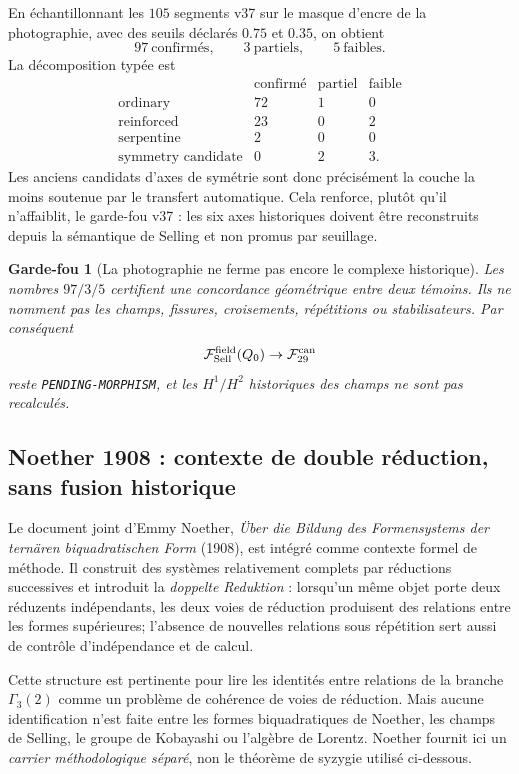 \documentclass[11pt,a4paper]{article}
\newtheorem{guardrail}[theorem]{Garde-fou}
\newcommand{\certPending}{\texttt{PENDING-MORPHISM}}
\begin{document}
En échantillonnant les $105$ segments v37 sur le masque d'encre de la photographie, avec des seuils déclarés $0.75$ et $0.35$, on obtient
\[
 \boxed{97\ \text{confirmés},\qquad 3\ \text{partiels},\qquad 5\ \text{faibles}}.
\]
La décomposition typée est
\[
\begin{array}{c|ccc}
&\text{confirmé}&\text{partiel}&\text{faible}\\ \hline
\text{ordinary}&72&1&0\\
\text{reinforced}&23&0&2\\
\text{serpentine}&2&0&0\\
\text{symmetry candidate}&0&2&3.
\end{array}
\]
Les anciens candidats d'axes de symétrie sont donc précisément la couche la moins soutenue par le transfert automatique. Cela renforce, plutôt qu'il n'affaiblit, le garde-fou v37 : les six axes historiques doivent être reconstruits depuis la sémantique de Selling et non promus par seuillage.

\begin{guardrail}[La photographie ne ferme pas encore le complexe historique]
Les nombres $97/3/5$ certifient une concordance géométrique entre deux témoins. Ils ne nomment pas les champs, fissures, croisements, répétitions ou stabilisateurs. Par conséquent
\[
 \mathcal F_{\rm Sell}^{\rm field}(Q_0)\to\mathcal F_{29}^{\rm can}
\]
reste \certPending{}, et les $H^1/H^2$ historiques des champs ne sont pas recalculés.
\end{guardrail}

\subsection{Noether 1908 : contexte de double réduction, sans fusion historique}

Le document joint d'Emmy Noether, \emph{Über die Bildung des Formensystems der ternären biquadratischen Form} (1908), est intégré comme contexte formel de méthode. Il construit des systèmes relativement complets par réductions successives et introduit la \emph{doppelte Reduktion} : lorsqu'un même objet porte deux réduzents indépendants, les deux voies de réduction produisent des relations entre les formes supérieures; l'absence de nouvelles relations sous répétition sert aussi de contrôle d'indépendance et de calcul.

Cette structure est pertinente pour lire les identités entre relations de la branche $\Gamma_3(2)$ comme un problème de cohérence de voies de réduction. Mais aucune identification n'est faite entre les formes biquadratiques de Noether, les champs de Selling, le groupe de Kobayashi ou l'algèbre de Lorentz. Noether fournit ici un \emph{carrier méthodologique séparé}, non le théorème de syzygie utilisé ci-dessous.
\end{document}
